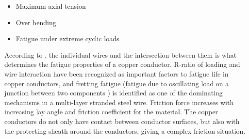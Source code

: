 \begin{itemize}
    \item Maximum axial tension
    \item Over bending
    \item Fatigue under extreme cyclic loads
\end{itemize}

\noindent According to \cite{Karlsen2010}, the individual wires and the intersection between them is what determines the fatigue properties of a copper conductor. R-ratio of loading and wire interaction have been recognized as important factors to fatigue life in copper conductors, and fretting fatigue (fatigue due to oscillating load on a junction between two components \cite{Hills1994}) is identified as one of the dominating mechanisms in a multi-layer stranded steel wire. Friction force increases with increasing lay angle and friction coefficient for the material. The copper conductors do not only have contact between conductor surfaces, but also with the protecting sheath around the conductors, giving a complex friction situation. 

